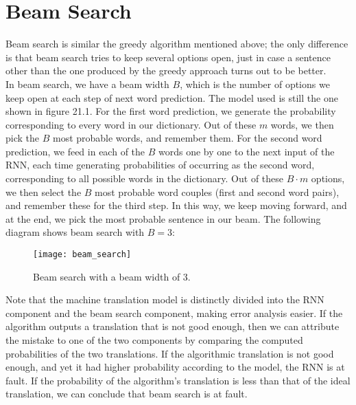 \documentclass[a4paper, 12pt]{report}
\begin{document}
\section{Beam Search}
Beam search is similar the greedy algorithm mentioned above; the only difference is that beam search tries to keep several options open, just in case a sentence other than the one produced by the greedy approach turns out to be better.\\
\break
In beam search, we have a beam width $B$, which is the number of options we keep open at each step of next word prediction. The model used is still the one shown in figure 21.1. For the first word prediction, we generate the probability corresponding to every word in our dictionary. Out of these $m$ words, we then pick the $B$ most probable words, and remember them. For the second word prediction, we feed in each of the $B$ words one by one to the next input of the RNN, each time generating probabilities of occurring as the second word, corresponding to all possible words in the dictionary. Out of these $B\cdot m$ options, we then select the $B$ most probable word couples (first and second word pairs), and remember these for the third step. In this way, we keep moving forward, and at the end, we pick the most probable sentence in our beam. The following diagram shows beam search with $B=3$:
\begin{figure}[H]
\centering
\texttt{[image: beam\_search]}
\caption{Beam search with a beam width of 3.}
\end{figure}
Note that the machine translation model is distinctly divided into the RNN component and the beam search component, making error analysis easier. If the algorithm outputs a translation that is not good enough, then we can attribute the mistake to one of the two components by comparing the computed probabilities of the two translations. If the algorithmic translation is not good enough, and yet it had higher probability according to the model, the RNN is at fault. If the probability of the algorithm's translation is less than that of the ideal translation, we can conclude that beam search is at fault.
\end{document}
